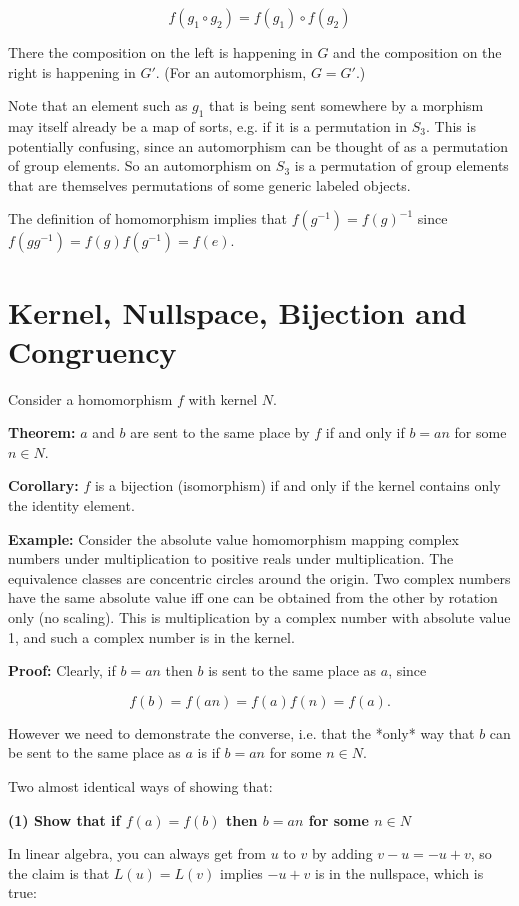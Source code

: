 $$
f(g_1 \circ g_2) = f(g_1) \circ f(g_2)
$$

There the composition on the left is happening in $G$ and the composition on
the right is happening in $G'$. (For an automorphism, $G=G'$.)

Note that an element such as $g_1$ that is being sent somewhere by a morphism
may itself already be a map of sorts, e.g. if it is a permutation in
$S_3$. This is potentially confusing, since an automorphism can be thought of
as a permutation of group elements. So an automorphism on $S_3$ is a
permutation of group elements that are themselves permutations of some generic
labeled objects.

The definition of homomorphism implies that $f(g^{-1}) = f(g)^{-1}$ since
$f(gg^{-1}) = f(g)f(g^{-1}) = f(e)$.

\section{Kernel, Nullspace, Bijection and Congruency}

Consider a homomorphism $f$ with kernel $N$.

\textbf{Theorem:} $a$ and $b$ are sent to the same place by $f$ if and only if
$b = an$ for some $n \in N$.

\textbf{Corollary:} $f$ is a bijection (isomorphism) if and only if the kernel
contains only the identity element.

\textbf{Example:} Consider the absolute value homomorphism mapping complex numbers
under multiplication to positive reals under multiplication. The equivalence
classes are concentric circles around the origin. Two complex numbers have the
same absolute value iff one can be obtained from the other by rotation only (no
scaling). This is multiplication by a complex number with absolute value 1, and
such a complex number is in the kernel.

\textbf{Proof:} Clearly, if $b = an$ then $b$ is sent to the same place as $a$,
since

$$
f(b) = f(an) = f(a)f(n) = f(a).
$$

However we need to demonstrate the converse, i.e. that the *only* way that $b$
can be sent to the same place as $a$ is if $b=an$ for some $n \in N$.

Two almost identical ways of showing that:

\textbf{(1) Show that if $f(a) = f(b)$ then $b = an$ for some $n \in N$}

In linear algebra, you can always get from $u$ to $v$ by adding $v - u = -u +
v$, so the claim is that $L(u) = L(v)$ implies $-u + v$ is in the nullspace,
which is true:

